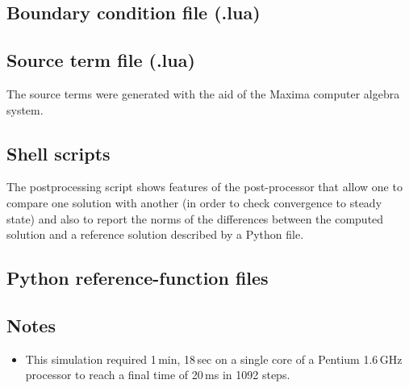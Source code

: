 \subsection{Boundary condition file (.lua)}
\topbar

\bottombar

\subsection{Source term file (.lua)}
%
The source terms were generated with the aid of the Maxima computer algebra system.
\topbar

\bottombar

\subsection{Shell scripts}
\label{mms-euler-sh-files}
\topbar

\bottombar

\noindent
\topbar

\bottombar

\noindent
The postprocessing script shows features of the post-processor that allow
one to compare one solution with another (in order to check convergence to steady state)
and also to report the norms of the differences between the computed solution and 
a reference solution described by a Python file.

\noindent
\topbar

\bottombar

\subsection{Python reference-function files}
\topbar

\bottombar

\noindent
\topbar

\bottombar

\subsection{Notes}
\begin{itemize}
\item This simulation required 1\,min, 18\,sec on a single core of 
  a Pentium 1.6\,GHz processor to reach a final time of 20\,ms in 1092 steps.
\end{itemize}

